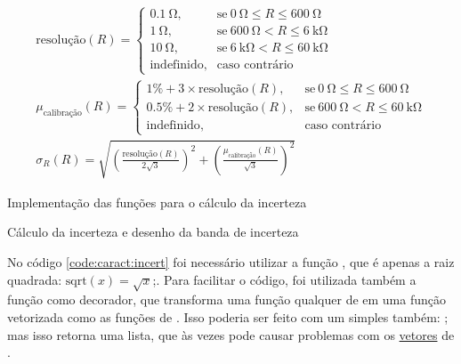     \begin{eqnarray}
        \label{eq:resolucao}
        \text{resolução}(R) = \begin{cases}
            \SI{0.1}{\ohm}, & \text{se}~ \SI{0}{\ohm} \le R \le \SI{600}{\ohm} \\
            \SI{1}{\ohm},   & \text{se}~ \SI{600}{\ohm} < R \le \SI{6}{\kilo\ohm} \\
            \SI{10}{\ohm},  & \text{se}~ \SI{6}{\kilo\ohm} < R \le \SI{60}{\kilo\ohm} \\
            \text{indefinido}, & \text{caso contrário}
        \end{cases} \\%
        \label{eq:calibracao}
        \mu_\text{calibração}(R) = \begin{cases}
            1\% + 3 \times \text{resolução}(R),   & \text{se}~ \SI{0}{\ohm} \le R \le \SI{600}{\ohm} \\
            0.5\% + 2 \times \text{resolução}(R), & \text{se}~ \SI{600}{\ohm} < R \le \SI{60}{\kilo\ohm} \\
            \text{indefinido}, & \text{caso contrário}
        \end{cases} \\%
        \label{eq:incerteza}
        \sigma_R(R) = \sqrt{\left(\frac{\text{resolução}(R)}{2 \sqrt{3}} \right)^2 + \left(\frac{\mu_\text{calibração}(R)}{\sqrt{3}} \right)^2}
    \end{eqnarray}

    \begin{listing}[H]
        \caption{Implementação das funções para o cálculo da incerteza}
        \label{code:caract:incert}

    \end{listing}

    \begin{listing}[H]
        \caption{Cálculo da incerteza e desenho da banda de incerteza}
        \label{code:caract:bandas}

    \end{listing}

    No código \ref{code:caract:incert} foi necessário utilizar a função , que é apenas a raiz quadrada: $\text{sqrt}(x) = \sqrt{x}$;. Para facilitar o código, foi utilizada também a função  como decorador, que transforma uma função qualquer de \python em uma função vetorizada como as funções de \numpy. Isso poderia ser feito com um simples  também: ; mas isso retorna uma lista, que às vezes pode causar problemas com os \href{https://docs.scipy.org/doc/numpy/reference/arrays.html}{vetores} de \numpy.

